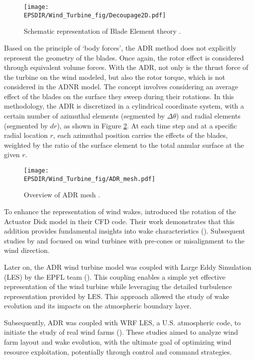 \begin{figure}[h]
\centering
\texttt{[image: \\EPSDIR/Wind\_Turbine\_fig/Decoupage2D.pdf]}
\caption{Schematic representation of Blade Element theory \citet{joulin2019modelisation}.}
\label{fig:Decoupage2D}
\end{figure}
\medbreak
Based on the principle of `body forces', the ADR method does not explicitly represent the geometry of the blades. Once again, the rotor effect is considered through equivalent volume forces. With the ADR, not only is the thrust force of the turbine on the wind modeled, but also the rotor torque, which is not considered in the ADNR model. The concept involves considering an average effect of the blades on the surface they sweep during their rotations. In this methodology, the ADR is discretized in a cylindrical coordinate system, with a certain number of azimuthal elements (segmented by $\Delta \theta$) and radial elements (segmented by $dr$), as shown in Figure \ref{fig:ADR_mesh}. At each time step and at a specific radial location $r$, each azimuthal position carries the effects of the blades, weighted by the ratio of the surface element to the total annular surface at the given $r$.

\begin{figure}[h]
\centering
\texttt{[image: \\EPSDIR/Wind\_Turbine\_fig/ADR\_mesh.pdf]}
\caption{Overview of ADR mesh \citet{joulin2019modelisation}.}
\label{fig:ADR_mesh}
\end{figure}
\medbreak

To enhance the representation of wind wakes, \citet{sorensen1992unsteady} introduced the rotation of the Actuator Disk model in their CFD code. Their work demonstrates that this addition provides fundamental insights into wake characteristics (\citet{sorensen1995model, sorensen1998analysis}). Subsequent studies by \citet{madsen1997cfd} and \citet{mikkelsen2003actuator} focused on wind turbines with pre-cones or misalignment to the wind direction.

Later on, the ADR wind turbine model was coupled with Large Eddy Simulation (LES) by the EPFL team (\citet{porte2011large, wu2011large, wu2015modeling, porte2014interaction}). This coupling enables a simple yet effective representation of the wind turbine while leveraging the detailed turbulence representation provided by LES. This approach allowed the study of wake evolution and its impacts on the atmospheric boundary layer.

Subsequently, ADR was coupled with WRF LES, a U.S. atmospheric code, to initiate the study of real wind farms (\citet{aitken2014utility, aitken2014large, mirocha2014implementation, mirocha2015investigating, marjanovic2015simulation}). These studies aimed to analyze wind farm layout and wake evolution, with the ultimate goal of optimizing wind resource exploitation, potentially through control and command strategies.


